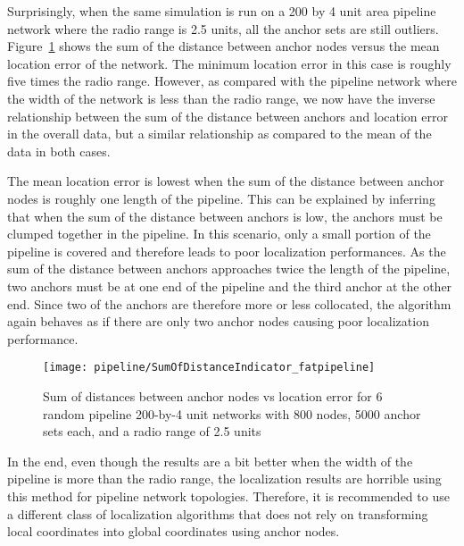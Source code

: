 Surprisingly, when the same simulation is run on a 200 by 4 unit area pipeline network where the radio range is 2.5 units, all the anchor sets are still outliers.  Figure~\ref{fig:fatpipelineindicator} shows the sum of the distance between anchor nodes versus the mean location error of the network.  The minimum location error in this case is roughly five times the radio range.  However, as compared with the pipeline network where the width of the network is less than the radio range, we now have the inverse relationship between the sum of the distance between anchors and location error in the overall data, but a similar relationship as compared to the mean of the data in both cases.  

The mean location error is lowest when the sum of the distance between anchor nodes is roughly one length of the pipeline.  This can be explained by inferring that when the sum of the distance between anchors is low, the anchors must be clumped together in the pipeline.  In this scenario, only a small portion of the pipeline is covered and therefore leads to poor localization performances. As the sum of the distance between anchors approaches twice the length of the pipeline, two anchors must be at one end of the pipeline and the third anchor at the other end.  Since two of the anchors are therefore more or less collocated, the algorithm again behaves as if there are only two anchor nodes causing poor localization performance.

\begin{figure}
  \centering
	\texttt{[image: pipeline/SumOfDistanceIndicator\_fatpipeline]}
	\caption[Sum of distances between anchor nodes vs location error in a pipeline topology]{Sum of distances between anchor nodes vs location error for 6 random pipeline 200-by-4 unit networks with 800 nodes, 5000 anchor sets each, and a radio range of 2.5 units}
	\label{fig:fatpipelineindicator}
\end{figure}

In the end, even though the results are a bit better when the width of the pipeline is more than the radio range, the localization results are horrible using this method for pipeline network topologies.  Therefore, it is recommended to use a different class of localization algorithms that does not rely on transforming local coordinates into global coordinates using anchor nodes.
